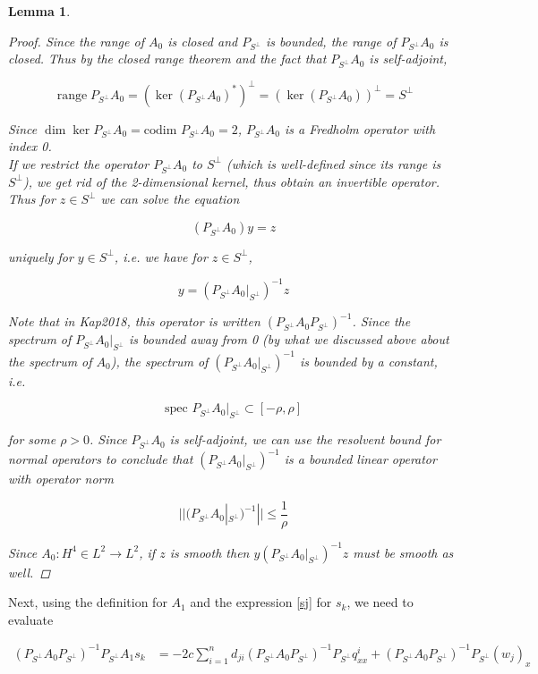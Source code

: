 \documentclass[12pt]{article}
\DeclareMathOperator{\ran}{range}
\newtheorem{lemma}{Lemma}
\begin{document}
\begin{lemma}
\begin{proof}
Since the range of $A_0$ is closed and $P_{S^\perp}$ is bounded, the range of $P_{S^\perp} A_0$ is closed. Thus by the closed range theorem and the fact that $P_{S^\perp} A_0$ is self-adjoint,

\[
\ran P_{S^\perp} A_0 = (\ker (P_{S^\perp} A_0)^*)^\perp = (\ker (P_{S^\perp} A_0))^\perp = S^\perp
\]

Since $\dim \ker P_{S^\perp} A_0 = \text{codim } P_{S^\perp} A_0 = 2$, $P_{S^\perp} A_0$ is a Fredholm operator with index 0.\\

If we restrict the operator $P_{S^\perp} A_0$ to $S^\perp$ (which is well-defined since its range is $S^\perp$), we get rid of the 2-dimensional kernel, thus obtain an invertible operator. Thus for $z \in S^\perp$ we can solve the equation

\[
(P_{S^\perp} A_0) y = z
\]

uniquely for $y \in S^\perp$, i.e. we have for $z \in S^\perp$,

\begin{equation}
y = (P_{S^\perp} A_0 |_{S^\perp})^{-1} z
\end{equation}

Note that in Kap2018, this operator is written $(P_{S^\perp} A_0 P_{S^\perp})^{-1}$. Since the spectrum of $P_{S^\perp} A_0 |_{S^\perp}$ is bounded away from 0 (by what we discussed above about the spectrum of $A_0$), the spectrum of $(P_{S^\perp} A_0 |_{S^\perp})^{-1}$ is bounded by a constant, i.e. 

\[
\text{spec } P_{S^\perp} A_0 |_{S^\perp}  \subset [-\rho, \rho]
\]

for some $\rho > 0$. Since $P_{S^\perp} A_0$ is self-adjoint, we can use the resolvent bound for normal operators to conclude that $(P_{S^\perp} A_0 |_{S^\perp})^{-1}$ is a bounded linear operator with operator norm

\[
|| (P_{S^\perp} A_0|_{S^\perp})^{-1} || \leq \frac{1}{\rho}
\]

Since $A_0: H^4 \in L^2 \rightarrow L^2$, if $z$ is smooth then $y (P_{S^\perp} A_0 |_{S^\perp})^{-1} z$ must be smooth as well.

\end{proof}
\end{lemma}

Next, using the definition for $A_1$ and the expression \eqref{sj} for $s_k$, we need to evaluate

\begin{align*}
(P_{S^\perp} A_0 P_{S^\perp})^{-1} P_{S^\perp} A_1 s_k 
&= -2c \sum_{i = 1}^{n} d_{ji} (P_{S^\perp} A_0 P_{S^\perp})^{-1} P_{S^\perp} q^i_{xx} + (P_{S^\perp} A_0 P_{S^\perp})^{-1} P_{S^\perp} (w_j)_x 
\end{align*}
\end{document}
